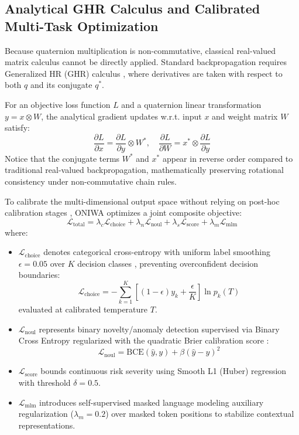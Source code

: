 \documentclass[10pt,twocolumn,letterpaper]{article}
\begin{document}
\subsection{Analytical GHR Calculus and Calibrated Multi-Task Optimization}
Because quaternion multiplication is non-commutative, classical real-valued matrix calculus cannot be directly applied. Standard backpropagation requires Generalized HR (GHR) calculus \cite{mandic2011ghr}, where derivatives are taken with respect to both $q$ and its conjugate $q^*$. 

For an objective loss function $L$ and a quaternion linear transformation $y = x \otimes W$, the analytical gradient updates w.r.t. input $x$ and weight matrix $W$ satisfy:
\begin{equation}
\frac{\partial L}{\partial x} = \frac{\partial L}{\partial y} \otimes W^*, \quad \frac{\partial L}{\partial W} = x^* \otimes \frac{\partial L}{\partial y}
\label{eq:ghr_gradients}
\end{equation}
Notice that the conjugate terms $W^*$ and $x^*$ appear in reverse order compared to traditional real-valued backpropagation, mathematically preserving rotational consistency under non-commutative chain rules.

To calibrate the multi-dimensional output space without relying on post-hoc calibration stages \cite{guo2017calibration}, ONIWA optimizes a joint composite objective:
\begin{equation}
\mathcal{L}_{\text{total}} = \lambda_c \mathcal{L}_{\text{choice}} + \lambda_n \mathcal{L}_{\text{noul}} + \lambda_s \mathcal{L}_{\text{score}} + \lambda_m \mathcal{L}_{\text{mlm}}
\end{equation}
where:
\begin{itemize}
    \item $\mathcal{L}_{\text{choice}}$ denotes categorical cross-entropy with uniform label smoothing $\epsilon = 0.05$ over $K$ decision classes \cite{muller2019label}, preventing overconfident decision boundaries:
    \begin{equation}
    \mathcal{L}_{\text{choice}} = -\sum_{k=1}^K \left[ (1-\epsilon) y_k + \frac{\epsilon}{K} \right] \ln p_k(T)
    \end{equation}
    evaluated at calibrated temperature $T$.
    \item $\mathcal{L}_{\text{noul}}$ represents binary novelty/anomaly detection supervised via Binary Cross Entropy regularized with the quadratic Brier calibration score \cite{brier1950}:
    \begin{equation}
    \mathcal{L}_{\text{noul}} = \text{BCE}(\hat{y}, y) + \beta (\hat{y} - y)^2
    \end{equation}
    \item $\mathcal{L}_{\text{score}}$ bounds continuous risk severity using Smooth L1 (Huber) regression with threshold $\delta = 0.5$.
    \item $\mathcal{L}_{\text{mlm}}$ introduces self-supervised masked language modeling auxiliary regularization ($\lambda_m = 0.2$) over masked token positions to stabilize contextual representations.
\end{itemize}
\end{document}
